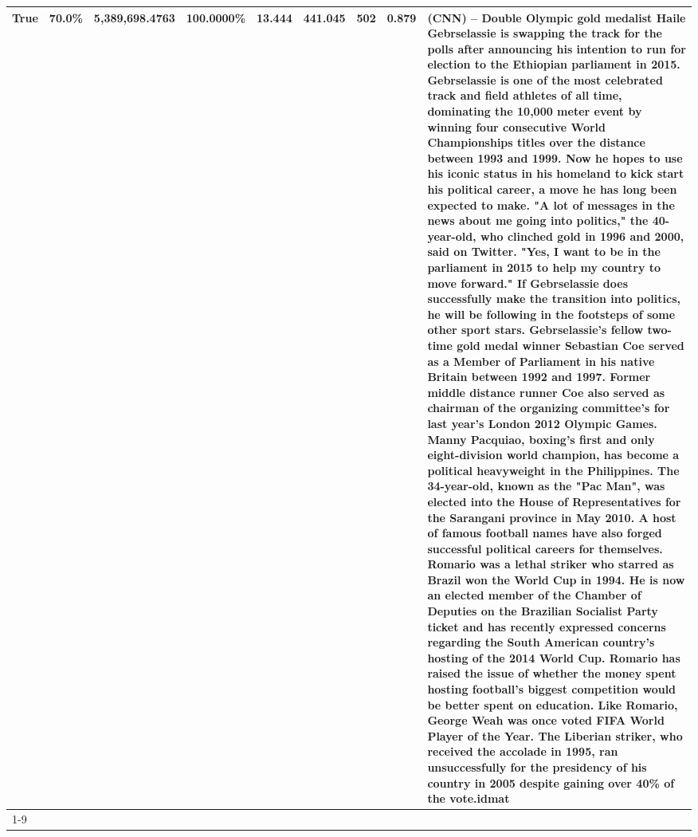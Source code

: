 \begin{table}[H]
{\begin{tabular}{lllrlllll}
True & 70.0\% & 5,389,698.4763 & \bfseries \color{red} 100.0000\% & 13.444 & 441.045 & 502 & 0.879 & (CNN) -- Double Olympic gold medalist Haile Gebrselassie is swapping the track for the polls after announcing his intention to run for election to the Ethiopian parliament in 2015. Gebrselassie is one of the most celebrated track and field athletes of all time, dominating the 10,000 meter event by winning four consecutive World Championships titles over the distance between 1993 and 1999. Now he hopes to use his iconic status in his homeland to kick start his political career, a move he has long been expected to make. "A lot of messages in the news about me going into politics," the 40-year-old, who clinched gold in 1996 and 2000, said on Twitter. "Yes, I want to be in the parliament in 2015 to help my country to move forward." If Gebrselassie does successfully make the transition into politics, he will be following in the footsteps of some other sport stars. Gebrselassie's fellow two-time gold medal winner Sebastian Coe served as a Member of Parliament in his native Britain between 1992 and 1997. Former middle distance runner Coe also served as chairman of the organizing committee's for last year's London 2012 Olympic Games. Manny Pacquiao, boxing's first and only eight-division world champion, has become a political heavyweight in the Philippines. The 34-year-old, known as the "Pac Man", was elected into the House of Representatives for the Sarangani province in May 2010. A host of famous football names have also forged successful political careers for themselves. Romario was a lethal striker who starred as Brazil won the World Cup in 1994. He is now an elected member of the Chamber of Deputies on the Brazilian Socialist Party ticket and has recently expressed concerns regarding the South American country's hosting of the 2014 World Cup. Romario has raised the issue of whether the money spent hosting football's biggest competition would be better spent on education. Like Romario, George Weah was once voted FIFA World Player of the Year. The Liberian striker, who received the accolade in 1995, ran unsuccessfully for the presidency of his country in 2005 despite gaining over 40\% of the vote.idmat \\
\cline{1-9}

\end{tabular}}
\end{table}
